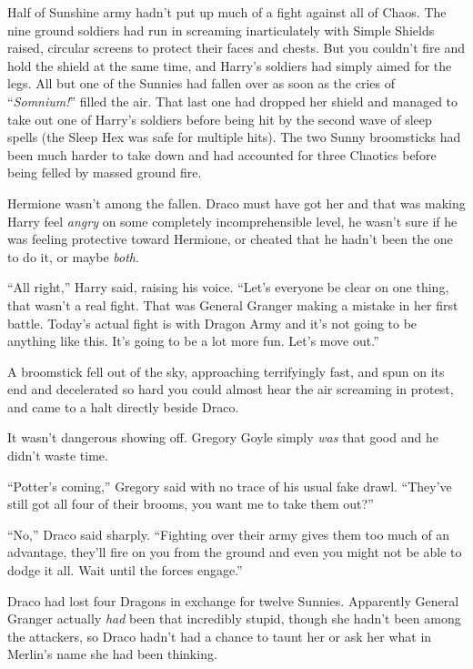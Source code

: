 Half of Sunshine army hadn’t put up much of a fight against all of Chaos. The nine ground soldiers had run in screaming inarticulately with Simple Shields raised, circular screens to protect their faces and chests. But you couldn’t fire and hold the shield at the same time, and Harry’s soldiers had simply aimed for the legs. All but one of the Sunnies had fallen over as soon as the cries of “\emph{Somnium!}” filled the air. That last one had dropped her shield and managed to take out one of Harry’s soldiers before being hit by the second wave of sleep spells (the Sleep Hex was safe for multiple hits). The two Sunny broomsticks had been much harder to take down and had accounted for three Chaotics before being felled by massed ground fire.

Hermione wasn’t among the fallen. Draco must have got her and that was making Harry feel \emph{angry} on some completely incomprehensible level, he wasn’t sure if he was feeling protective toward Hermione, or cheated that he hadn’t been the one to do it, or maybe \emph{both}.

“All right,” Harry said, raising his voice. “Let’s everyone be clear on one thing, that wasn’t a real fight. That was General Granger making a mistake in her first battle. Today’s actual fight is with Dragon Army and it’s not going to be anything like this. It’s going to be a lot more fun. Let’s move out.”

\later

A broomstick fell out of the sky, approaching terrifyingly fast, and spun on its end and decelerated so hard you could almost hear the air screaming in protest, and came to a halt directly beside Draco.

It wasn’t dangerous showing off. Gregory Goyle simply \emph{was} that good and he didn’t waste time.

“Potter’s coming,” Gregory said with no trace of his usual fake drawl. “They’ve still got all four of their brooms, you want me to take them out?”

“No,” Draco said sharply. “Fighting over their army gives them too much of an advantage, they’ll fire on you from the ground and even you might not be able to dodge it all. Wait until the forces engage.”

Draco had lost four Dragons in exchange for twelve Sunnies. Apparently General Granger actually \emph{had} been that incredibly stupid, though she hadn’t been among the attackers, so Draco hadn’t had a chance to taunt her or ask her what in Merlin’s name she had been thinking.

